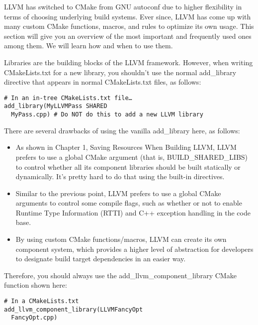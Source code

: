 LLVM has switched to CMake from GNU autoconf due to higher flexibility in terms of choosing underlying build systems. Ever since, LLVM has come up with many custom CMake functions, macros, and rules to optimize its own usage. This section will give you an overview of the most important and frequently used ones among them. We will learn how and when to use them.


Libraries are the building blocks of the LLVM framework. However, when writing CMakeLists.txt for a new library, you shouldn't use the normal add\_library directive that appears in normal CMakeLists.txt files, as follows:

\begin{lstlisting}[style=styleCMake]
# In an in-tree CMakeLists.txt file…
add_library(MyLLVMPass SHARED
  MyPass.cpp) # Do NOT do this to add a new LLVM library
\end{lstlisting}

There are several drawbacks of using the vanilla add\_library here, as follows:

\begin{itemize}
\item As shown in Chapter 1, Saving Resources When Building LLVM, LLVM prefers to use a global CMake argument (that is, BUILD\_SHARED\_LIBS) to control whether all its component libraries should be built statically or dynamically. It's pretty hard to do that using the built-in directives.

\item Similar to the previous point, LLVM prefers to use a global CMake arguments to control some compile flags, such as whether or not to enable Runtime Type Information (RTTI) and C++ exception handling in the code base.

\item By using custom CMake functions/macros, LLVM can create its own component system, which provides a higher level of abstraction for developers to designate build target dependencies in an easier way.

\end{itemize}

Therefore, you should always use the add\_llvm\_component\_library CMake function shown here:

\begin{lstlisting}[style=styleCMake]
# In a CMakeLists.txt
add_llvm_component_library(LLVMFancyOpt
  FancyOpt.cpp)
\end{lstlisting}

